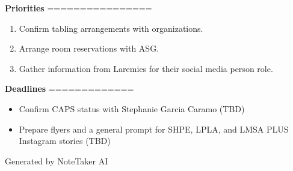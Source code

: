 \documentclass[11pt,a4paper]{article}
\begin{document}
\textbf{Priorities}
================

\begin{enumerate}
  \item  Confirm tabling arrangements with organizations.
  \item  Arrange room reservations with ASG.
  \item  Gather information from Laremies for their social media person role.
\end{enumerate}

\textbf{Deadlines}
=============

\begin{itemize}
  \item   Confirm CAPS status with Stephanie Garcia Caramo (TBD)
  \item   Prepare flyers and a general prompt for SHPE, LPLA, and LMSA PLUS Instagram stories (TBD)
\end{itemize}

\vspace{1cm}

\begin{center}
\textcolor{secondarycolor}{\small Generated by NoteTaker AI}
\end{center}
\end{document}

